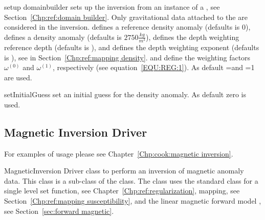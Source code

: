 \begin{methoddesc}[GravityInversion]{setup}{
domainbuilder
}
sets up the inversion from an instance  of a , see Section~\ref{Chp:ref:domain builder}.
Only gravitational data attached to the  are considered in the inversion.
 defines a reference density anomaly (defaults is 0), 
 defines a density anomaly (defaults is $2750 \frac{kg}{m^3}$),
 defines the depth weighting reference depth (defaults is \None), and
 defines the depth weighting exponent (defaults is \None),
see  in Section~\ref{Chp:ref:mapping density}.
 and  define the weighting factors
$\omega^{(0)}$ and
$\omega^{(1)}$, respectively (see equation~\ref{EQU:REG:1}).
As default =\None and =1 are used.
\end{methoddesc}

\begin{methoddesc}[GravityInversion]{setInitialGuess}{}
set an initial guess for the density anomaly. As default zero is used.
\end{methoddesc}

\subsection{Magnetic Inversion Driver}
For examples of usage please see Chapter~\ref{Chp:cook:magnetic inversion}.


\begin{classdesc}{MagneticInversion}{}
Driver class to perform an inversion of magnetic anomaly data. This class
is a sub-class of the  class. The class uses the standard
 class for a single level set function, see Chapter~\ref{Chp:ref:regularization},
 mapping, see Section~\ref{Chp:ref:mapping susceptibility}, and the linear
magnetic forward model , see Section~\ref{sec:forward magnetic}.
\end{classdesc}


